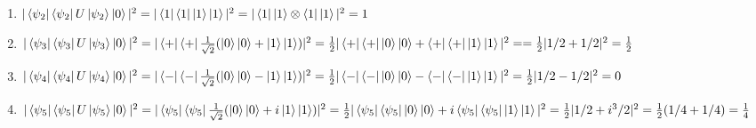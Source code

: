 \documentclass[12pt]{article}
\begin{document}
\begin{enumerate}
\begin{enumerate}
\begin{enumerate}
    \item $|\bra{\psi_2}\bra{\psi_2}U\ket{\psi_2} \ket{0}|^2 = |\bra{1}\bra{1}\ket{1}\ket{1}|^2 = |\bra{1}\ket{1}\otimes \bra{1}\ket{1}|^2 = 1 $

    \item $|\bra{\psi_3}\bra{\psi_3}U\ket{\psi_3} \ket{0}|^2 = |\bra{+}\bra{+}\frac{1}{\sqrt{2}}(\ket{0}\ket{0} + \ket{1}\ket{1})|^2 = \frac{1}{2}|\bra{+}\bra{+}\ket{0}\ket{0} + \bra{+}\bra{+}\ket{1}\ket{1}|^2 = 
    = \frac{1}{2}|1/2 + 1/2|^2 = \frac{1}{2}$
    
    \item $|\bra{\psi_4}\bra{\psi_4}U\ket{\psi_4} \ket{0}|^2 = |\bra{-}\bra{-}\frac{1}{\sqrt{2}}(\ket{0}\ket{0} - \ket{1}\ket{1})|^2 = \frac{1}{2}|\bra{-}\bra{-}\ket{0}\ket{0} - \bra{-}\bra{-}\ket{1}\ket{1}|^2 = \frac{1}{2}|1/2 - 1/2|^2 = 0$
    
    \item $|\bra{\psi_5}\bra{\psi_5}U\ket{\psi_5} \ket{0}|^2 = |\bra{\psi_5}\bra{\psi_5}\frac{1}{\sqrt{2}}(\ket{0}\ket{0} + i\ket{1}\ket{1})|^2 = \frac{1}{2}|\bra{\psi_5}\bra{\psi_5}\ket{0}\ket{0} + i\bra{\psi_5}\bra{\psi_5}\ket{1}\ket{1}|^2 = \frac{1}{2}|1/2 + i^3/2|^2 = \frac{1}{2}(1/4+1/4) = \frac{1}{4}$    


\end{enumerate}
\end{enumerate}
\end{enumerate}
\end{document}
